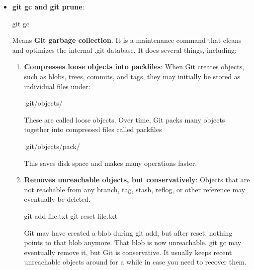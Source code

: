 \documentclass{report}
\begin{document}
\begin{itemize}
\begin{itemize}
                \item \textbf{commit}:  snapshot metadata + pointer to a tree
            \end{itemize}
        \item \textbf{git gc and git prune}: 
            \bigbreak \noindent 
            \begin{bashcode}
                git gc
            \end{bashcode}
            \bigbreak \noindent 
            Means \textbf{Git garbage collection}. It is a maintenance command that cleans and optimizes the internal .git database. It does several things, including:
            \begin{enumerate}
                \item \textbf{Compresses loose objects into packfiles}: When Git creates objects, such as blobs, trees, commits, and tags, they may initially be stored as individual files under:
                    \bigbreak \noindent 
                    \begin{bashcode}
                        .git/objects/
                    \end{bashcode}
                    \bigbreak \noindent 
                    These are called loose objects. Over time, Git packs many objects together into compressed files called packfiles
                    \bigbreak \noindent 
                    \begin{bashcode}
                        .git/objects/pack/
                    \end{bashcode}
                    \bigbreak \noindent 
                    This saves disk space and makes many operations faster.
                \item \textbf{Removes unreachable objects, but conservatively}: Objects that are not reachable from any branch, tag, stash, reflog, or other reference may eventually be deleted.
                    \bigbreak \noindent 
                    \begin{bashcode}
                        git add file.txt
                        git reset file.txt
                    \end{bashcode}
                    \bigbreak \noindent 
                    Git may have created a blob during git add, but after reset, nothing points to that blob anymore. That blob is now unreachable.
                    \bigbreak \noindent 
                    git gc may eventually remove it, but Git is conservative. It usually keeps recent unreachable objects around for a while in case you need to recover them.

\end{enumerate}
\end{itemize}
\end{document}
